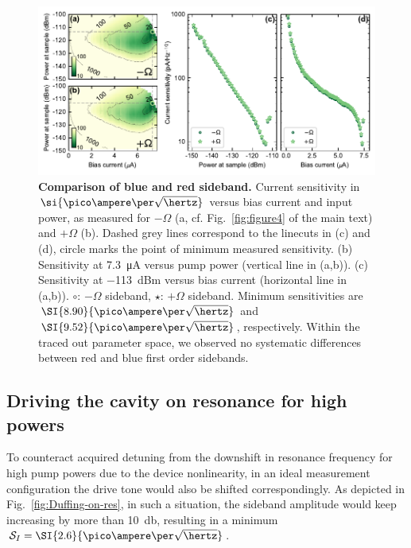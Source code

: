 \begin{figure}
	\centering
	\includegraphics[width=\linewidth]{chapter-currentdetection/figures/SM_plusminus}
	\caption{
		\textbf{Comparison of blue and red sideband.}
		Current sensitivity in $\si{\pico\ampere\per\sqrt{\hertz}}$ versus bias current and input power, as measured for $-\Omega$ (a, cf. Fig.~\ref{fig:figure4} of the main text) and $+\Omega$ (b).
		Dashed grey lines correspond to the linecuts in (c) and (d), circle marks the point of minimum measured sensitivity.
		(b) Sensitivity at \SI{7.3}{\micro\ampere} versus pump power (vertical line in (a,b)).
		(c) Sensitivity at \SI{-113}{dBm} versus bias current (horizontal line in (a,b)).
		$\circ$: $-\Omega$ sideband, $\star$: $+\Omega$ sideband.
		Minimum sensitivities are $\SI{8.90}{\pico\ampere\per\sqrt{\hertz}}$ and $\SI{9.52}{\pico\ampere\per\sqrt{\hertz}}$, respectively.
		Within the traced out parameter space, we observed no systematic differences between red and blue first order sidebands.
	}
	\label{fig:plusminus}
\end{figure}


\subsection{Driving the cavity on resonance for high powers}\label{sec:drive_shift}
To counteract acquired detuning from the downshift in resonance frequency for high pump powers due to the device nonlinearity, in an ideal measurement configuration the drive tone would also be shifted correspondingly.
% 
As depicted in Fig.~\ref{fig:Duffing-on-res}, in such a situation, the sideband amplitude would keep increasing by more than \SI{10}{\decibel}, resulting in a minimum $\mathcal{S}_I=\SI{2.6}{\pico\ampere\per\sqrt{\hertz}}$.

